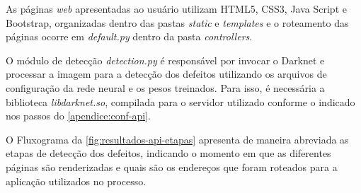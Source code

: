 As páginas \textit{web} apresentadas ao usuário utilizam HTML5, CSS3, Java Script e Bootstrap, organizadas dentro das pastas \textit{static} e \textit{templates} e o roteamento das páginas ocorre em \textit{default.py} dentro da pasta \textit{controllers}.

O módulo de detecção \textit{detection.py} é responsável por invocar o Darknet e processar a imagem para a detecção dos defeitos utilizando os arquivos de configuração da rede neural e os pesos treinados.
Para isso, é necessária a biblioteca \textit{libdarknet.so}, compilada para o servidor utilizado conforme o indicado nos passos do
\autoref{apendice:conf-api}.

O Fluxograma da \autoref{fig:resultados-api-etapas} apresenta de maneira abreviada as etapas de detecção dos defeitos, indicando o momento em que as diferentes páginas são renderizadas e quais são os endereços que foram roteados para a aplicação utilizados no processo.

